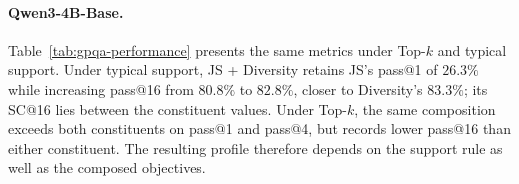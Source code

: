 \documentclass{article} %
\begin{document}
\paragraph{Qwen3-4B-Base.}
Table~\ref{tab:gpqa-performance} presents the same metrics under Top-$k$ and typical support.
Under typical support, JS + Diversity retains JS's pass@1 of $26.3\%$ while increasing pass@16 from $80.8\%$ to $82.8\%$, closer to Diversity's $83.3\%$; its SC@16 lies between the constituent values.
Under Top-$k$, the same composition exceeds both constituents on pass@1 and pass@4, but records lower pass@16 than either constituent.
The resulting profile therefore depends on the support rule as well as the composed objectives.

\begin{table}[!htbp]
\centering
\small
\setlength{\tabcolsep}{6pt}
\renewcommand{\arraystretch}{1.12}
\end{table}
\end{document}
